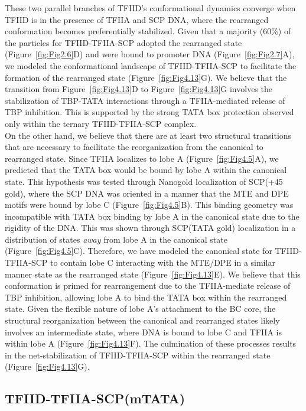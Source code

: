 \indent These two parallel branches of TFIID's conformational dynamics converge when TFIID is in the presence of TFIIA and SCP DNA, where the rearranged conformation becomes preferentially stabilized. Given that a majority (60\%) of the particles for TFIID-TFIIA-SCP adopted the rearranged state (Figure~\ref{fig:Fig2.6}D) and were bound to promoter DNA (Figure~\ref{fig:Fig2.7}A), we modeled the conformational landscape of TFIID-TFIIA-SCP to facilitate the formation of the rearranged state (Figure~\ref{fig:Fig4.13}G). We believe that the transition from Figure~\ref{fig:Fig4.13}D to Figure~\ref{fig:Fig4.13}G involves the stabilization of TBP-TATA interactions through a TFIIA-mediated release of TBP inhibition. This is supported by the strong TATA box protection observed only within the ternary TFIID-TFIIA-SCP complex. \\
\indent On the other hand, we believe that there are at least two structural transitions that are necessary to facilitate the reorganization from the canonical to rearranged state. Since TFIIA localizes to lobe A (Figure~\ref{fig:Fig4.5}A), we predicted that the TATA box would be bound by lobe A within the canonical state.  This hypothesis was tested through Nanogold localization of SCP(+45 gold), where the SCP DNA was oriented in a manner that the MTE and DPE motifs were bound by lobe C (Figure~\ref{fig:Fig4.5}B). This binding geometry was incompatible with TATA box binding by lobe A in the canonical state due to the rigidity of the DNA. This was shown through SCP(TATA gold) localization in a distribution of states \emph{away} from lobe A in the canonical state (Figure~\ref{fig:Fig4.5}C). Therefore, we have modeled the canonical state for TFIID-TFIIA-SCP to contain lobe C interacting with the MTE/DPE in a similar manner state as the rearranged state (Figure~\ref{fig:Fig4.13}E). We believe that this conformation is primed for rearrangement due to the TFIIA-mediate release of TBP inhibition, allowing lobe A to bind the TATA box within the rearranged state. Given the flexible nature of lobe A's attachment to the BC core, the structural reorganization between the canonical and rearranged states likely involves an intermediate state, where DNA is bound to lobe C and TFIIA is within lobe A (Figure~\ref{fig:Fig4.13}F). The culmination of these processes results in the net-stabilization of TFIID-TFIIA-SCP within the rearranged state (Figure~\ref{fig:Fig4.13}G).\\ 

\subsection{TFIID-TFIIA-SCP(mTATA)}

